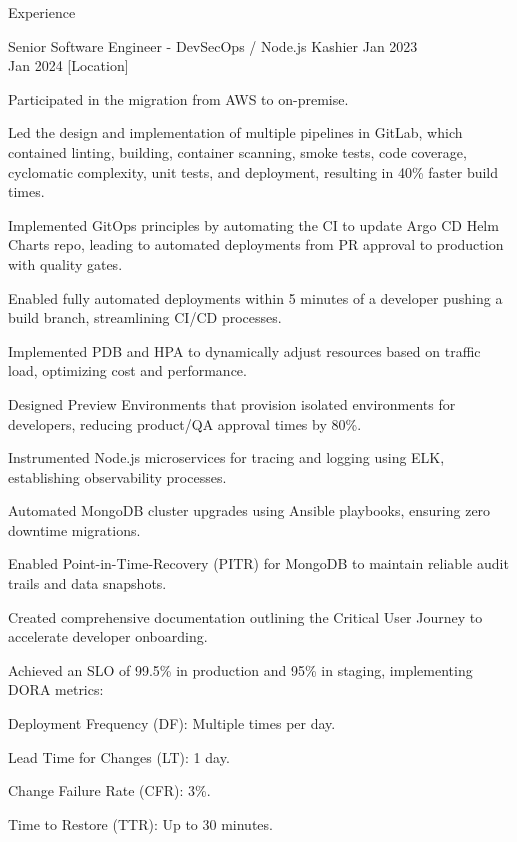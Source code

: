 \documentclass{resume} %
\begin{document}
\begin{rSection}{Experience}
    \begin{rSubsection}
        {Senior Software Engineer - DevSecOps / Node.js}
        {Kashier}
        {Jan 2023 \\ Jan 2024}
        [Location]
        \begin{rItemize}
            \item Participated in the migration from AWS to on-premise.
            \item Led the design and implementation of multiple pipelines in GitLab, which contained linting, building, container scanning, smoke tests, code coverage, cyclomatic complexity, unit tests, and deployment, resulting in 40\% faster build times.
            \item Implemented GitOps principles by automating the CI to update Argo CD Helm Charts repo, leading to automated deployments from PR approval to production with quality gates.
            \item Enabled fully automated deployments within 5 minutes of a developer pushing a build branch, streamlining CI/CD processes.
            \item Implemented PDB and HPA to dynamically adjust resources based on traffic load, optimizing cost and performance.
            \item Designed Preview Environments that provision isolated environments for developers, reducing product/QA approval times by 80\%.
            \item Instrumented Node.js microservices for tracing and logging using ELK, establishing observability processes.
            \item Automated MongoDB cluster upgrades using Ansible playbooks, ensuring zero downtime migrations.
            \item Enabled Point-in-Time-Recovery (PITR) for MongoDB to maintain reliable audit trails and data snapshots.
            \item Created comprehensive documentation outlining the Critical User Journey to accelerate developer onboarding.
            \item Achieved an SLO of 99.5\% in production and 95\% in staging, implementing DORA metrics:
            \begin{rItemize}
                \item Deployment Frequency (DF): Multiple times per day.
                \item Lead Time for Changes (LT): 1 day.
                \item Change Failure Rate (CFR): 3\%.
                \item Time to Restore (TTR): Up to 30 minutes.
            \end{rItemize}
        \end{rItemize}
    \end{rSubsection}


\end{rSection}
\end{document}
